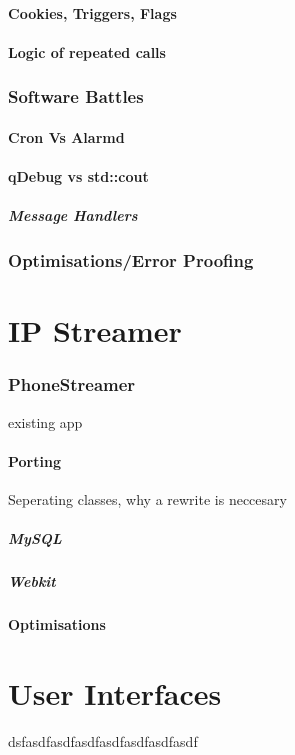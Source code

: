 \documentclass[11pt]{article} %
\begin{document}
\subsection{Cookies, Triggers, Flags}
\subsection{Logic of repeated calls}
\section{Software Battles}
\subsection{Cron Vs Alarmd}
\subsection{qDebug vs std::cout}
\subsubsection{Message Handlers}
\section{Optimisations/Error Proofing}


\part{IP Streamer}
\section{PhoneStreamer}{existing app}
\subsection{Porting}{Seperating classes, why a rewrite is neccesary}
\subsubsection{MySQL}
\subsubsection{Webkit}
\subsection{Optimisations}


\part{User Interfaces}{dsfasdfasdfasdfasdfasdfasdfasdf}
\end{document}
